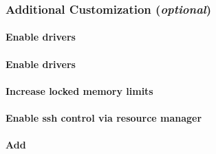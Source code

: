 \documentclass[letterpaper]{article}
\begin{document}



\subsubsection{Additional Customization ({\em optional})} \label{sec:addl_customizations}


\paragraph{Enable \InfiniBand{} drivers}


\paragraph{Enable \OmniPath{} drivers}


\vspace*{0.28cm}
\paragraph{Increase locked memory limits}


\vspace*{-.17cm}
\paragraph{Enable ssh control via resource manager}


\vspace*{-.17cm}
\paragraph{Add \beegfs{}} \label{sec:add_beegfs}

\end{document}
